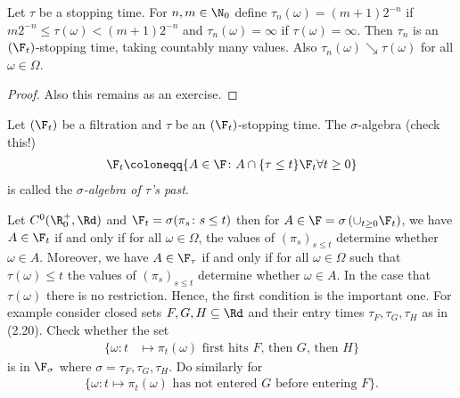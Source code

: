 \begin{lem}[Approximation]
Let $\tau$ be a stopping time. For $n,m \in \N_0$ define $\tau_n(\omega)=(m+1)2^{-n}$ if $m2^{-n}\leq \tau(\omega)<(m+1)2^{-n}$ 
and $\tau_n(\omega)=\infty$ if $\tau(\omega)=\infty$.
Then $\tau_n$ is an $(\F_t)$-stopping time, taking countably many values.
Also $\tau_n(\omega)\searrow \tau(\omega)$ for all $\omega \in \Omega$.
\end{lem}
\begin{proof}
Also this remains as an exercise.
\end{proof}

\begin{defi}
Let $(\F_t)$ be a filtration and $\tau$ be an $(\F_t)$-stopping time.
The $\sigma$-algebra (check this!)
\begin{align*}
\F_t \coloneqq \{A \in \F \colon A \cap \{\tau \leq t\} \F_t \forall t \geq 0\}
\end{align*}
is called the \emph{$\sigma$-algebra of $\tau$'s past}.
\end{defi}

\begin{bsp}
Let $C^0(\R_0^+,\Rd)$ and $\F_t=\sigma(\pi_s \colon s\leq t)$ then for $A \in \F=\sigma\left(\cup_{t\geq 0}\F_t\right)$, we have
$A \in \F_t$ if and only if for all $\omega \in \Omega$, the values of $(\pi_s)_{s\leq t}$ determine whether $\omega \in A$.
Moreover, we have $A \in \F_\tau$ if and only if for all $\omega \in \Omega$
such that $\tau(\omega)\leq t$ the values of $(\pi_s)_{s\leq t}$ determine whether $\omega \in A$.
In the case that $\tau(\omega)$ there is no restriction.
Hence, the first condition is the important one.
For example consider closed sets $F,G,H\subseteq \Rd$ and their entry times
$\tau_F,\tau_G,\tau_H$ as in (2.20).
Check whether the set
\begin{align*}
\{\omega \colon t&\mapsto \pi_t(\omega)\text{ first hits } F\text{, then } G\text{, then } H\}
\end{align*}
is in $\F_\sigma$ where $\sigma=\tau_F,\tau_G,\tau_H$.
Do similarly for
\begin{align*}
\{\omega \colon t \mapsto \pi_t(\omega) \text{ has not entered } G \text{ before entering } F\}. 
\end{align*}
\end{bsp}

